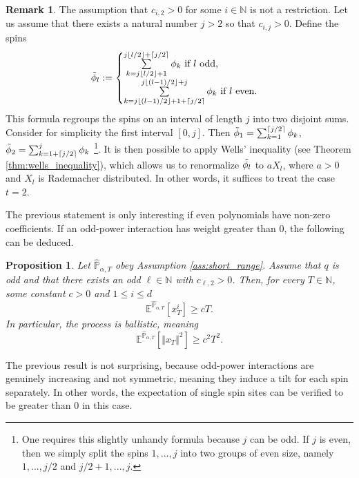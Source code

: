 \documentclass[reqno,11pt]{amsart}
\newcommand{\1}{\mathds{1}}
\theoremstyle{plain}
\newtheorem{proposition}[theorem]{Proposition}
\theoremstyle{definition}
\newtheorem{remark}[theorem]{Remark}
\numberwithin{equation}{section}
\newcommand{\bbE}{{\mathbb E}}
\newcommand{\bbN}{{\mathbb N}}
\newcommand{\bbP}{{\mathbb P}}
\newcommand{\bbPh}{\hat{\bbP}}
\begin{document}
\begin{remark}
    \label{rem:s.r.w.suffices}
    The assumption that $c_{i,2} > 0$ for some $i \in \bbN$ is not a restriction. Let us assume that there exists a natural number $j > 2$ so that $c_{i,j} > 0$. Define the spins
    $$\Tilde{\phi}_l := \begin{cases}
        \sum\limits_{k= j \lfloor l/2 \rfloor +1  } ^{j \lfloor l/2 \rfloor  + \lceil j/2 \rceil} \phi_k \text{ if $l$ odd,} \\
        \sum\limits_{k= j \lfloor (l-1)/2 \rfloor + 1 + \lceil j/2 \rceil  } ^{ j \lfloor (l-1)/2 \rfloor  + j } \phi_k \text{ if $l$ even.}
    \end{cases}$$
    This formula regroups the spins on an interval of length $j$ into two disjoint sums. Consider for simplicity the first interval  $[0,j]$. Then $\Tilde{\phi}_1 = \sum_{k=1} ^{\lceil j/2 \rceil} \phi_k$, $\Tilde{\phi}_2 = \sum_{k=1 + \lceil j/2 \rceil} ^{j} \phi_k$ \footnote{One requires this slightly unhandy formula because  $j$ can be odd. If $j$ is even, then we simply split the spins $1,...,j$ into two groups of even size, namely $1,...,j/2$ and $j/2 +1,...,j$.}. 
    It is then possible to apply Wells' inequality (see Theorem \ref{thm:wells_inequality}), which allows us to renormalize $\Tilde{\phi_l}$ to $a X_l$, where $a > 0$ and $X_l$ is Rademacher distributed. In other words, it suffices to treat the case $t=2$.
\end{remark}

The previous statement is only interesting if even polynomials have non-zero coefficients. If an odd-power interaction has weight greater than $0$, the following can be deduced.
\begin{proposition}
    \label{prop:odd_interaction}
    Let $\bbPh_{\alpha,T}$ obey Assumption \ref{ass:short_range}. Assume that $q$ is odd and that there exists an odd $\ell\in\bbN$ with $c_{\ell,2}>0$.
    Then, for every $T \in \bbN$, some constant $c>0$ and $1 \le i \le d$
    $$\bbE^{\bbPh_{\alpha,T}} [ x_T ^i ] \ge cT.$$
    In particular, the process is ballistic, meaning 
    $$\bbE^{\bbPh_{\alpha,T}} [ \Vert x_T \Vert ^2 ] \ge c^2 T^2.$$
    
\end{proposition}
The previous result is not surprising, because odd-power interactions are genuinely increasing and not symmetric, meaning they induce a tilt for each spin separately. In other words, the expectation of single spin sites can be verified to be greater than $0$ in this case.
\end{document}
